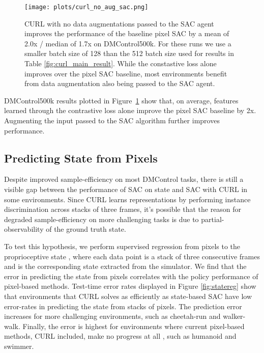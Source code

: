 \documentclass{article}
\begin{document}



\begin{figure}[H]
\vskip 0.2in
\begin{center}
\centerline{\texttt{[image: plots/curl\_no\_aug\_sac.png]}}
\caption{CURL with no data augmentations passed to the SAC agent improves the performance of the baseline pixel SAC by a mean of 2.0x / median of 1.7x on DMControl500k. For these runs we use a smaller batch size of 128 than the 512 batch size used for results in Table \ref{fig:curl_main_result}. While the constastive loss alone improves over the pixel SAC baseline, most environments benefit from data augmentation also being passed to the SAC agent.}
\label{fig:curl_noaug}
\end{center}
\vskip -0.2in
\end{figure}

DMControl500k results plotted in Figure~\ref{fig:curl_noaug} show that, on average, features learned through the contrastive loss alone improve the pixel SAC baseline by 2x. Augmenting the input passed to the SAC algorithm further improves performance.

\subsection{Predicting State from Pixels}

Despite improved sample-efficiency on most DMControl tasks, there is still a visible gap between the performance of SAC on state and SAC with CURL in some environments. Since CURL learns representations by performing instance discrimination across stacks of three frames, it's possible that the reason for degraded sample-efficiency on more challenging tasks is due to partial-observability of the ground truth state. 

To test this hypothesis, we perform supervised regression  from pixels  to the proprioceptive state , where each data point  is a stack of three consecutive frames and  is the corresponding state extracted from the simulator. We find that the error in predicting the state from pixels correlates with the policy performance of pixel-based methods. Test-time error rates displayed in Figure \ref{fig:statereg} show that environments that CURL solves as efficiently as state-based SAC have low error-rates in predicting the state from stacks of pixels. The prediction error increases for more challenging environments, such as cheetah-run and walker-walk. Finally, the error is highest for environments where current pixel-based methods, CURL included, make no progress at all \cite{tassa2018deepmind}, such as humanoid and swimmer.
\end{document}
